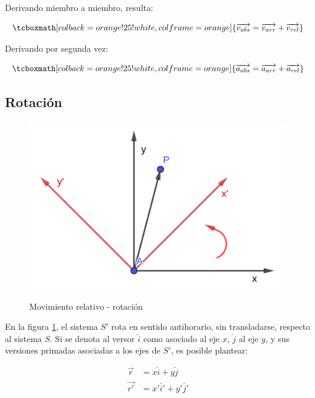 \documentclass{article}
\begin{document}
Derivando miembro a miembro, resulta:

\begin{equation}
\tcboxmath[colback=orange!25!white,colframe=orange]{
\overrightarrow{v_{abs}} = \overrightarrow{v_{arr}} + \overrightarrow{v_{rel}}
}
\end{equation}

Derivando por segunda vez:

\begin{equation}
\tcboxmath[colback=orange!25!white,colframe=orange]{
\overrightarrow{a_{abs}} = \overrightarrow{a_{arr}} + \overrightarrow{a_{rel}}
}
\end{equation}

\subsection{Rotación}

\begin{figure}[ht]
\centering
\caption{Movimiento relativo - rotación}
\includegraphics[scale=1.3]{../../common/img/62.01/theory/04-kinematics-rel-mov-rot.png}
\label{fig:relMovRot}
\end{figure}

En la figura \ref{fig:relMovRot}, el sistema $S'$ rota en sentido antihorario, sin transladarse, respecto al sistema $S$. Si se denota al versor $\check{i}$ como asociado al eje $x$, $\check{j}$ al eje $y$, y sus versiones primadas asociadas a los ejes de $S'$, es posible plantear:

\begin{subequations}
\begin{align}
\overrightarrow{r} &= x \check{i} + y \check{j} \\
\overrightarrow{r'} &= x' \check{i'} + y' \check{j'}
\end{align}
\end{subequations}
\end{document}
